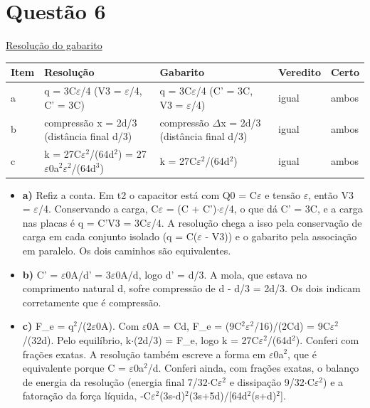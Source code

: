 \documentclass{article}%
\begin{document}
\section*{Questão 6}%
\href{https://poliedroresolve.sistemapoliedro.com.br/vestibulares/ita/2027/ita-2-fase-dia-3-22-10-2026-2-fase-dia-3/dissertativa-6-fisica-2-fase-dia-3-ita-2027}{Resolução do gabarito}\par\smallskip%
\begin{longtable}{@{}p{} p{} p{} p{} p{}@{}}\toprule Item & Resolução & Gabarito & Veredito & Certo \\ \midrule
a & q = 3C$\varepsilon$/4 (V3 = $\varepsilon$/4, C' = 3C) & q = 3C$\varepsilon$/4 (C' = 3C, V3 = $\varepsilon$/4) & igual & ambos \\
b & compressão x = 2d/3 (distância final d/3) & compressão $\Delta$x = 2d/3 (distância final d/3) & igual & ambos \\
c & k = 27C$\varepsilon$$^2$/(64d$^2$) = 27$\varepsilon$0a$^2$$\varepsilon$$^2$/(64d$^3$) & k = 27C$\varepsilon$$^2$/(64d$^2$) & igual & ambos \\
\bottomrule\end{longtable}%
\begin{itemize}%
\item%
\textbf{a)} Refiz a conta. Em t2 o capacitor está com Q0 = C$\varepsilon$ e tensão $\varepsilon$, então V3 = $\varepsilon$/4. Conservando a carga, C$\varepsilon$ = (C + C')$\cdot$$\varepsilon$/4, o que dá C' = 3C, e a carga nas placas é q = C'V3 = 3C$\varepsilon$/4. A resolução chega a isso pela conservação de carga em cada conjunto isolado (q = C($\varepsilon$ - V3)) e o gabarito pela associação em paralelo. Os dois caminhos são equivalentes.%
\item%
\textbf{b)} C' = $\varepsilon$0A/d' = 3$\varepsilon$0A/d, logo d' = d/3. A mola, que estava no comprimento natural d, sofre compressão de d - d/3 = 2d/3. Os dois indicam corretamente que é compressão.%
\item%
\textbf{c)} F\_e = q$^2$/(2$\varepsilon$0A). Com $\varepsilon$0A = Cd, F\_e = (9C$^2$$\varepsilon$$^2$/16)/(2Cd) = 9C$\varepsilon$$^2$/(32d). Pelo equilíbrio, k$\cdot$(2d/3) = F\_e, logo k = 27C$\varepsilon$$^2$/(64d$^2$). Conferi com frações exatas. A resolução também escreve a forma em $\varepsilon$0a$^2$, que é equivalente porque C = $\varepsilon$0a$^2$/d. Conferi ainda, com frações exatas, o balanço de energia da resolução (energia final 7/32$\cdot$C$\varepsilon$$^2$ e dissipação 9/32$\cdot$C$\varepsilon$$^2$) e a fatoração da força líquida, -C$\varepsilon$$^2$(3s-d)$^2$(3s+5d)/{[}64d$^2$(s+d)$^2${]}.%
\end{itemize}%
\end{document}
